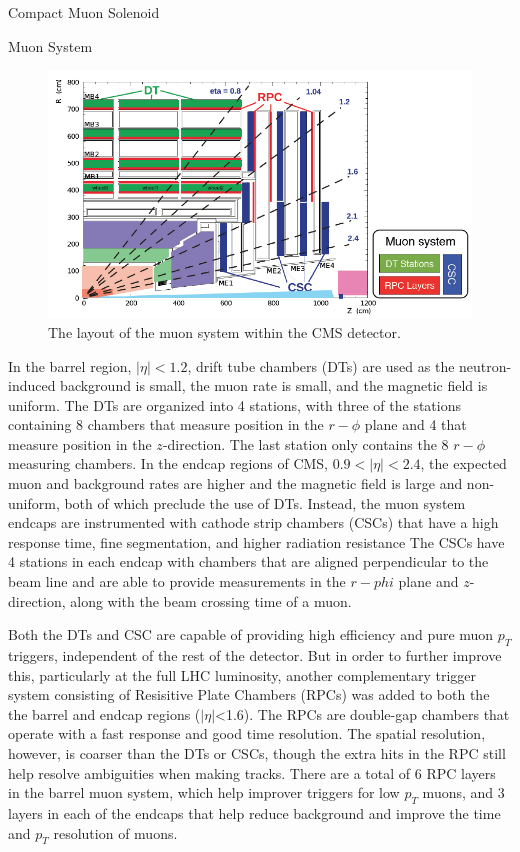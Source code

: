 \begin{section}{Compact Muon Solenoid}
\begin{subsection}{Muon System}
\begin{figure}[tbp!]
\begin{center}
\includegraphics[angle=0,width=0.80\columnwidth]{fig/cms_muonsys.png}
\end{center}
\caption{The layout of the muon system within the CMS detector.}
\label{fig:cms_muonsys}
\end{figure}

In the barrel region, $|\eta|<1.2$, drift tube chambers (DTs) are used as the neutron-induced background is small, the muon rate is small, and the magnetic field is uniform.
The DTs are organized into 4 stations, with three of the stations containing 8 chambers that measure position in the $r-\phi$ plane and 4 that measure position in the $z$-direction.
The last station only contains the 8 $r-\phi$ measuring chambers.
In the endcap regions of CMS, $0.9<|\eta|<2.4$, the expected muon and background rates are higher and the magnetic field is large and non-uniform, both of which preclude the use of DTs.
Instead, the muon system endcaps are instrumented with cathode strip chambers (CSCs) that have a high response time, fine segmentation, and higher radiation resistance
The CSCs have 4 stations in each endcap with chambers that are aligned perpendicular to the beam line and are able to provide measurements in the $r-phi$ plane and $z$-direction, along with the beam crossing time of a muon.

Both the DTs and CSC are capable of providing high efficiency and pure muon $p_{T}$ triggers, independent of the rest of the detector.
But in order to further improve this, particularly at the full LHC luminosity, another complementary trigger system consisting of Resisitive Plate Chambers (RPCs) was added to both the the barrel and endcap regions ($|\eta|$<1.6).
The RPCs are double-gap chambers that operate with a fast response and good time resolution.
The spatial resolution, however, is coarser than the DTs or CSCs, though the extra hits in the RPC still help resolve ambiguities when making tracks.
There are a total of 6 RPC layers in the barrel muon system, which help improver triggers for low $p_{T}$ muons, and 3 layers in each of the endcaps that help reduce background and improve the time and $p_{T}$ resolution of muons.


\end{subsection}
\end{section}
